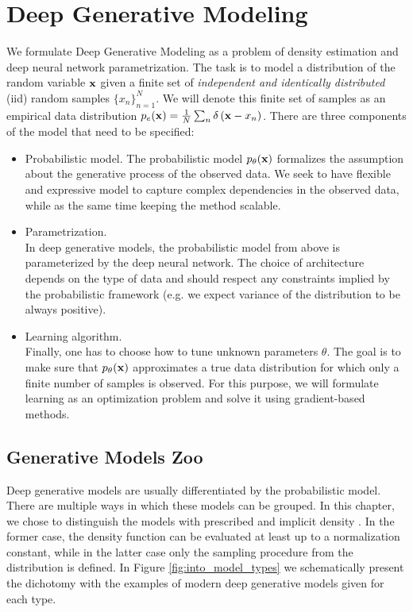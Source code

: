 \section{Deep Generative Modeling}\label{sec:intro_generative_models_types}
We formulate Deep Generative Modeling as a problem of density estimation and deep neural network parametrization. 
The task is to model a distribution of the random variable ${\mathbf{x}}$ given a finite set of \textit{independent and identically distributed} (iid) random samples $\{x_n\}_{n=1}^N$. 
We will denote this finite set of samples as an empirical data distribution $p_e({\mathbf{x}}) = \frac1N \sum_n \delta\left({\mathbf{x}} - x_n\right)$. 
There are three components of the model that need to be specified:
\begin{itemize}
\item Probabilistic model. \newline 
{}
The probabilistic model $p_{\theta}({\mathbf{x}})$ formalizes the assumption about the generative process of the observed data. 
We seek to have flexible and expressive model to capture complex dependencies in the observed data, while as the same time keeping the method scalable.


\item Parametrization.\\
In deep generative models, the probabilistic model from above is parameterized by the deep neural network. 
The choice of architecture depends on the type of data and should respect any constraints implied by the probabilistic framework (e.g. we expect variance of the distribution to be always positive).

\item Learning algorithm. \\
Finally, one has to choose how to tune unknown parameters $\theta$. The goal is to make sure that $p_{\theta}({\mathbf{x}})$ approximates a true data distribution for which only a finite number of samples is observed. For this purpose, we will formulate learning as an optimization problem and solve it using gradient-based methods. 
\end{itemize}

\subsection{Generative Models Zoo}\label{subsec:intro_gen_zoo}
Deep generative models are usually differentiated by the probabilistic model. 
There are multiple ways in which these models can be grouped. In this chapter, we chose to distinguish the models with prescribed and implicit density \citep{diggle1984monte}. In the former case, the density function can be evaluated at least up to a normalization constant, while in the latter case only the sampling procedure from the distribution is defined. 
In Figure \ref{fig:into_model_types} we schematically present the dichotomy with the examples of modern deep generative models given for each type.


